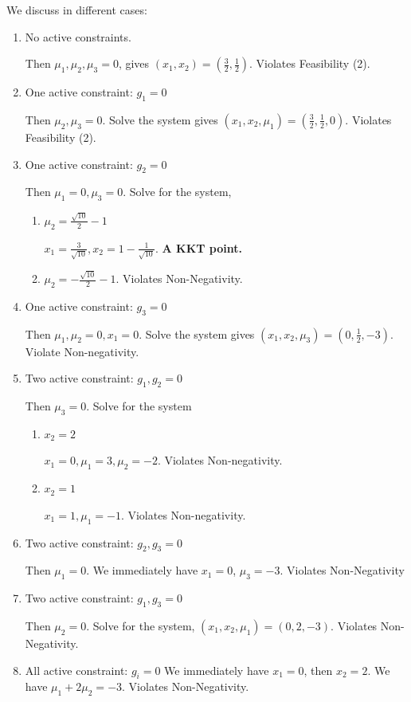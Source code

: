 We discuss in different cases:
\begin{enumerate}
\item No active constraints.
\par Then $\mu_1, \mu_2, \mu_3 = 0$, gives $(x_1, x_2) = (\frac{3}{2}, \frac{1}{2})$. Violates Feasibility (2).


\item One active constraint: $g_1 = 0$
\par Then $\mu_2, \mu_3 = 0$. Solve the system gives $(x_1, x_2, \mu_1) = (\frac{3}{2}, \frac{1}{2}, 0)$. Violates Feasibility (2).

\item One active constraint: $g_2 = 0$ 
\par Then $\mu_1 = 0, \mu_3 = 0$. Solve for the system, 
\begin{enumerate}
\item $\mu_2 = \frac{\sqrt{10}}{2} - 1$
\par $x_1 = \frac{3}{\sqrt{10}}, x_2 = 1 - \frac{1}{\sqrt{10}}$.\textbf{ A KKT point.}
\item  $\mu_2 = - \frac{\sqrt{10}}{2} - 1$. Violates Non-Negativity.
\end{enumerate}


\item One active constraint: $g_3 = 0$ 
\par Then $\mu_1, \mu_2 = 0, x_1 = 0$. Solve the system gives $(x_1, x_2, \mu_3) = (0, \frac{1}{2}, -3)$. Violate Non-negativity. 

\item Two active constraint: $g_1, g_2 = 0$ 
\par Then $\mu_3 = 0$. Solve for the system
\begin{enumerate}
\item $x_2 = 2$
\par $x_1 = 0, \mu_1 = 3, \mu_2 = -2$. Violates Non-negativity.
\item $x_2 = 1$
\par $x_1 = 1, \mu_1 = -1$. Violates Non-negativity.
\end{enumerate}


\item Two active constraint: $g_2, g_3 = 0$ 
\par Then $\mu_1 = 0$.
We immediately have $x_1 = 0$, $\mu_3 = -3$. Violates Non-Negativity

\item Two active constraint: $g_1, g_3 = 0$ 
\par Then $\mu_2 = 0$. Solve for the system, $(x_1, x_2, \mu_1) = (0, 2, -3)$. Violates Non-Negativity. 

\item All active constraint: $g_i = 0$ 
We immediately have $x_1 = 0$, then $x_2 = 2$. We have $\mu_1 + 2\mu_2 = -3$. Violates Non-Negativity. 

\end{enumerate}

